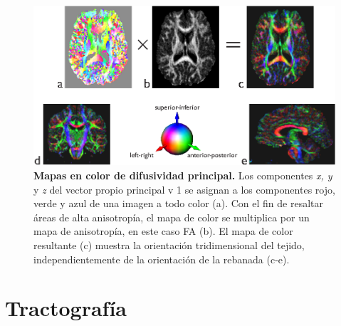\documentclass[12pt,a5,twoside]{book}
\begin{document}
\begin{figure}
	\centering
    \includegraphics [scale=1,center] {DTI_colormaps.eps}
    \caption{\textbf{Mapas en color de difusividad principal.} Los componentes {\it x, y} y {\it z} del vector propio principal v 1 se asignan a los componentes rojo, verde y azul de una imagen a todo color (a). Con el fin de resaltar áreas de alta anisotropía, el mapa de color se multiplica por un mapa de anisotropía, en este caso FA (b). El mapa de color resultante (c) muestra la orientación tridimensional del tejido, independientemente de la orientación de la rebanada (c-e).}
    \label{F:DTI_colormaps}
\end{figure}

\section{Tractografía}
\end{document}
